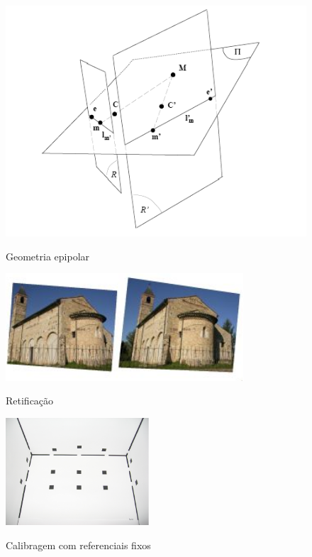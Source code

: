 \begin{figure}[ht]
	\begin{minipage}[b]{0.3\linewidth}
	    \centering
	    \includegraphics[width=\textwidth]{images/epipolar.png}
	 	\caption{Geometria epipolar}
	 	\label{fig:epipolar}
	\end{minipage}
	\hspace{0.1cm}
	\begin{minipage}[b]{0.3\linewidth}
	    \centering
	    \includegraphics[width=\textwidth,height=4cm]{images/rectification.png}
	 	\caption{Retificação }
	 	\label{fig:rectification}
	\end{minipage}
	\hspace{0.1cm}
	\begin{minipage}[b]{0.3\linewidth}
		\centering
	    \includegraphics[width=\textwidth,height=4cm]{images/bioview.png}
	 	\caption{Calibragem com referenciais fixos}
	 	\label{fig:bioview}
	\end{minipage}
\end{figure}

